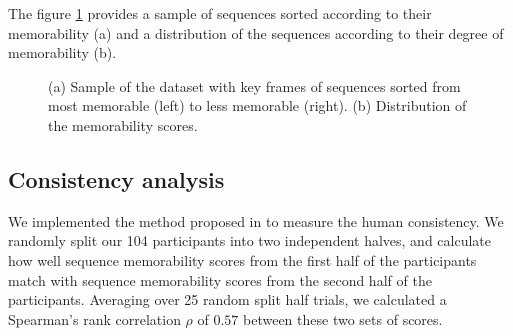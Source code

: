\documentclass[sigconf]{acmart}
\begin{document}
The figure \ref{fig:overview} provides a sample of sequences sorted according to their memorability (a) and a distribution of the sequences according to their degree of memorability (b).

\begin{figure}[!htbp]
	\centering
	\quad
	\quad
	\caption{\label{fig:overview}(a) Sample of the dataset with key frames of sequences sorted from most memorable (left) to less memorable (right). (b) Distribution of the memorability scores.}
\end{figure}

\subsection{Consistency analysis}
We implemented the method proposed in \cite{isola_2014_makes} to measure the human consistency.
We randomly split our 104 participants into two independent halves, and calculate how well sequence memorability scores from the first half of the participants match with sequence memorability scores from the second half of the participants.
Averaging over 25 random split half trials, we calculated a Spearman's rank correlation $\rho$ of $0.57$ between these two sets of scores.
\end{document}
